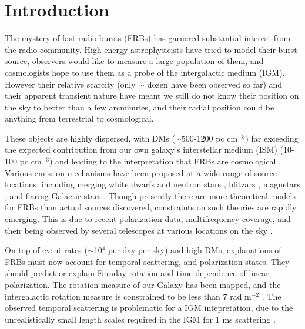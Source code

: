 \documentclass[useAMS,usenatbib]{mn2e}
\begin{document}
\newcommand{\be}{\begin{eqnarray}}
\newcommand{\ee}{\end{eqnarray}}
\newcommand{\beq}{\begin{equation}}
\newcommand{\eeq}{\end{equation}}

\section{Introduction}
The mystery of fast radio bursts (FRBs) has garnered
substantial interest from the radio community.
High-energy astrophysicists have tried to model their burst source, 
observers would like to measure a large population of them, and cosmologists
hope to use them as a probe of the intergalactic medium (IGM). However their relative scarcity 
(only $\sim$ dozen have been observed so far) and their apparent 
transient nature have meant we still do not know their position on the sky
to better than a few arcminutes, and their radial position could be anything
from terrestrial to cosmological.

These objects are
highly dispersed, with DMs ($\sim 500$-1200 pc cm$^{-3}$) far exceeding
the expected contribution from our own galaxy's interstellar medium (ISM) (10-100 pc cm$^{-3}$) and leading to the
interpretation that FRBs are cosmological \citep{2007Sci...318..777L, 2013Sci...341...53T}. 
Various emission mechanisms have been proposed 
at a wide range of source locations, 
including merging white dwarfs \citep{2012ApJ...760...64M}
and neutron stars \citep{2013PASJ...65L..12T},
blitzars \citep{2014A&A...562A.137F}, 
magnetars \citep{2015arXiv150101341P, 2014MNRAS.442L...9L}, 
and flaring Galactic stars \citep{2014MNRAS.439L..46L}.
Though presently there are more theoretical models for FRBs than actual 
sources discovered, constraints on such theories are rapidly emerging. 
This is due to recent polarization data, 
multifrequency coverage, and their being observed by several telescopes
at various locations on the sky \citep{2014ApJ...780L...2B, 2014arXiv1412.0342P}. 

On top of event rates ($\sim$10$^4$ per day per sky) 
and high DMs, explanations of FRBs must now
account for temporal scattering, and polarization states.  They should
predict or explain Faraday rotation and time dependence of linear polarization.
The rotation measure of our Galaxy has been mapped, and the
intergalactic rotation measure is constrained to be less than 7 rad m$^{-2}$
\citep{2015A&A...575A.118O}. 
The observed temporal scattering is problematic for a IGM intepretation, due 
to the unrealistically small length scales required in the IGM 
for 1 ms scattering \citep{2014ApJ...785L..26L}. 
\end{document}

